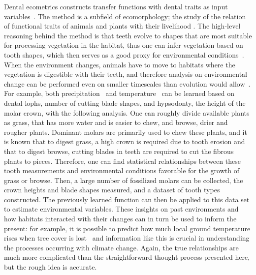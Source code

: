 \documentclass[english,twoside,openright]{UH_DS_MSc}
\begin{document}
Dental ecometrics constructs transfer functions with dental traits as input variables~\cite{Faith_Lyman_2019_ch9, oksanenHumboldtianApproachLife2019}.
The method is a subfield of ecomorphology; the study of the relation of functional traits of animals and plants with their livelihood
\cite{oksanenHumboldtianApproachLife2019}. The high-level reasoning behind the method is that teeth evolve to 
shapes that are most suitable for processing vegetation in the habitat, thus one can infer vegetation based on tooth shapes, 
which then serves as a good proxy for environmental conditions~\cite{oksanenHumboldtianApproachLife2019}. 
When the environment changes, animals have to move to habitats where the vegetation is digestible with their teeth, and therefore
analysis on environmental change can be performed even on smaller timescales than evolution would allow~\cite{fortelius}. For example, both precipitation~\cite{fortelius}
and temperature~\cite{oksanenHumboldtianApproachLife2019} can be learned based on dental lophs, number of cutting blade shapes, and hypsodonty, the height of the
molar crown, with the following analysis. One can roughly divide available plants as grass, that has more water and is easier to chew, and 
browse, drier and rougher plants. Dominant molars are primarily used to chew these plants, and it is known that to digest grass, a high 
crown is required due to tooth erosion and that to digest browse, cutting blades in teeth are required to cut the fibrous plants to pieces.
Therefore, one can find statistical relationships between these tooth measurements and environmental conditions favorable 
for the growth of grass or browse. Then, a large number of fossilized molars can be collected, the crown heights and blade shapes measured, and a dataset of 
tooth types constructed. The previously learned function can then be applied to this data set
 to estimate environmental variables. These insights on 
 past environments and how habitats interacted with their changes can 
 in turn be used to inform the present: for example, it is possible to predict how much local ground temperature rises when tree cover is lost~\cite{fortelius} and
information like this is crucial in understanding the processes occurring with climate
change.
  Again, the true relationships are much more complicated 
 than the straightforward thought process presented here, but the rough idea is accurate.
\end{document}
